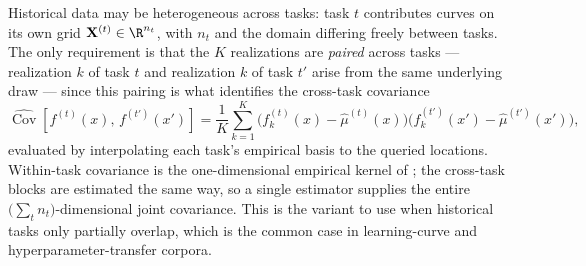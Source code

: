 Historical data may be heterogeneous across tasks: task $t$ contributes curves on
its own grid $\mathbf{X}^{(t)}\in\R^{n_t}$, with $n_t$ and the domain differing
freely between tasks. The only requirement is that the $K$ realizations are
\emph{paired} across tasks --- realization $k$ of task $t$ and realization $k$ of
task $t'$ arise from the same underlying draw --- since this pairing is what
identifies the cross-task covariance
\begin{equation}
    \widehat{\operatorname{Cov}}\!\left[f^{(t)}(x),\, f^{(t')}(x')\right]
    = \frac{1}{K}\sum_{k=1}^{K}
      \big(f^{(t)}_k(x) - \hat\mu^{(t)}(x)\big)
      \big(f^{(t')}_k(x') - \hat\mu^{(t')}(x')\big),
\end{equation}
evaluated by interpolating each task's empirical basis to the queried locations.
Within-task covariance is the one-dimensional empirical kernel of
; the cross-task blocks are estimated the same
way, so a single estimator supplies the entire
$\big(\sum_t n_t\big)$-dimensional joint covariance. This is the variant to use
when historical tasks only partially overlap, which is the common case in
learning-curve and hyperparameter-transfer corpora.


%
%
%
%
%
%
%
%
%
